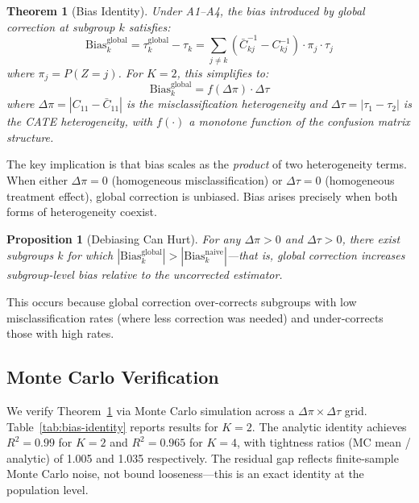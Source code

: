 \documentclass[11pt]{article}
\newtheorem{theorem}{Theorem}
\newtheorem{proposition}{Proposition}
\begin{document}
\begin{theorem}[Bias Identity]
\label{thm:bias-identity}
Under A1--A4, the bias introduced by global correction at subgroup $k$ satisfies:
\begin{equation}
\text{Bias}_k^{\text{global}} = \tau_k^{\text{global}} - \tau_k = \sum_{j \neq k} (\bar{C}^{-1}_{kj} - C^{-1}_{kj}) \cdot \pi_j \cdot \tau_j
\label{eq:bias-identity}
\end{equation}
where $\pi_j = P(Z = j)$.
For $K=2$, this simplifies to:
\begin{equation}
\text{Bias}_k^{\text{global}} = f(\Delta\pi) \cdot \Delta\tau
\label{eq:product-form}
\end{equation}
where $\Delta\pi = |C_{11} - \bar{C}_{11}|$ is the misclassification heterogeneity and $\Delta\tau = |\tau_1 - \tau_2|$ is the CATE heterogeneity, with $f(\cdot)$ a monotone function of the confusion matrix structure.
\end{theorem}

The key implication is that bias scales as the \emph{product} of two heterogeneity terms.
When either $\Delta\pi = 0$ (homogeneous misclassification) or $\Delta\tau = 0$ (homogeneous treatment effect), global correction is unbiased.
Bias arises precisely when both forms of heterogeneity coexist.

\begin{proposition}[Debiasing Can Hurt]
\label{prop:hurts}
For any $\Delta\pi > 0$ and $\Delta\tau > 0$, there exist subgroups $k$ for which $|\text{Bias}_k^{\text{global}}| > |\text{Bias}_k^{\text{naive}}|$---that is, global correction \emph{increases} subgroup-level bias relative to the uncorrected estimator.
\end{proposition}

This occurs because global correction over-corrects subgroups with low misclassification rates (where less correction was needed) and under-corrects those with high rates.

\subsection{Monte Carlo Verification}

We verify Theorem~\ref{thm:bias-identity} via Monte Carlo simulation across a $\Delta\pi \times \Delta\tau$ grid.
Table~\ref{tab:bias-identity} reports results for $K{=}2$.
The analytic identity achieves $R^2 = 0.99$ for $K{=}2$ and $R^2 = 0.965$ for $K{=}4$, with tightness ratios (MC mean / analytic) of 1.005 and 1.035 respectively.
The residual gap reflects finite-sample Monte Carlo noise, not bound looseness---this is an exact identity at the population level.
\end{document}

